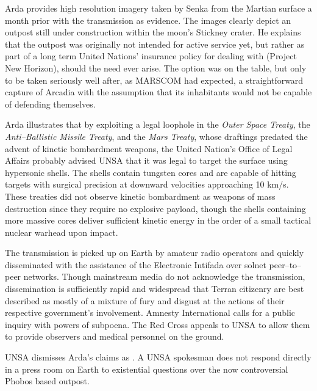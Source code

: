 Arda provides high resolution imagery taken by Senka from the Martian surface a month prior with the transmission as evidence. The images clearly depict an outpost still under construction within the moon's Stickney crater. He explains that the outpost was originally not intended for active service yet, but rather as part of a long term United Nations' insurance policy for dealing with  (Project New Horizon), should the need ever arise. The option was on the table, but only to be taken seriously well after, as MARSCOM had expected, a straightforward capture of Arcadia with the assumption that its inhabitants would not be capable of defending themselves.

Arda illustrates that by exploiting a legal loophole in the {\it Outer Space Treaty}, the {\it Anti--Ballistic Missile Treaty}, and the {\it Mars Treaty}, whose draftings predated the advent of kinetic bombardment weapons, the United Nation's Office of Legal Affairs probably advised UNSA that it was legal to target the surface using hypersonic shells. The shells contain tungsten cores and are capable of hitting targets with surgical precision at downward velocities approaching 10 km/s. These treaties did not observe kinetic bombardment as weapons of mass destruction since they require no explosive payload, though the shells containing more massive cores deliver sufficient kinetic energy in the order of a small tactical nuclear warhead upon impact.

The transmission is picked up on Earth by amateur radio operators and quickly disseminated with the assistance of the Electronic Intifada over solnet peer--to--peer networks. Though mainstream media do not acknowledge the transmission, dissemination is sufficiently rapid and widespread that Terran citizenry are best described as mostly of a mixture of fury and disgust at the actions of their respective government's involvement. Amnesty International calls for a public inquiry with powers of subpoena. The Red Cross appeals to UNSA to allow them to provide observers and medical personnel on the ground.

UNSA dismisses Arda's claims as . A UNSA spokesman does not respond directly in a press room on Earth to existential questions over the now controversial Phobos based outpost. 


